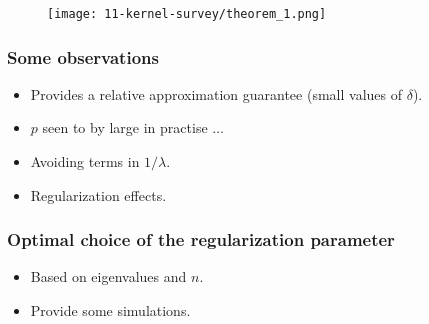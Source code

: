 \begin{frame}
    \begin{figure}[t]
        \texttt{[image: 11-kernel-survey/theorem\_1.png]}
        \centering
    \end{figure}
\end{frame}


\begin{frame}
    \frametitle{Some observations}

    \begin{itemize}
        \item Provides a relative approximation guarantee (small values of $\delta$). 
        \item $p$ seen to by large in practise $\dots$
        \item Avoiding terms in $1/\lambda$. 
        \item Regularization effects.  
    \end{itemize}
\end{frame}

\begin{frame}
    \frametitle{Optimal choice of the regularization parameter}

    \begin{itemize}
        \item Based on eigenvalues and $n$.
        \item Provide some simulations. 
    \end{itemize}
\end{frame}